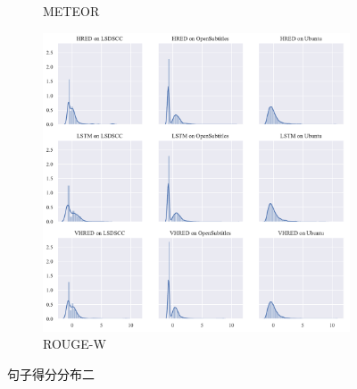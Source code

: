 \begin{figure}[H]
\begin{subfigure}{0.33\linewidth}
        \caption{METEOR}
    \end{subfigure}%
    \begin{subfigure}{0.33\linewidth}
        \centering
        \includegraphics[width=\linewidth]{figure/distplot_grid/rouge_w/plot.pdf}
        \caption{ROUGE-W}
    \end{subfigure}
    \centering
    \caption{句子得分分布二}
\end{figure}
